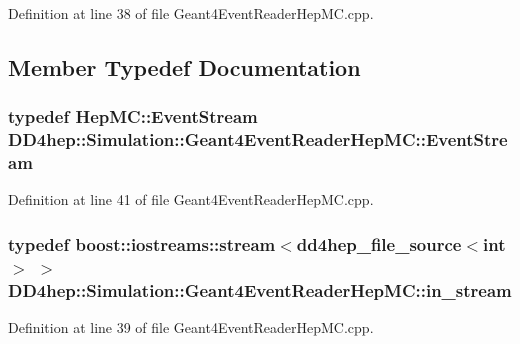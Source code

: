 Definition at line 38 of file Geant4EventReaderHepMC.cpp.

\subsection{Member Typedef Documentation}
\hypertarget{class_d_d4hep_1_1_simulation_1_1_geant4_event_reader_hep_m_c_a260380eb48d2adb971aaade903a47da8}{
\subsubsection[{EventStream}]{\setlength{\rightskip}{0pt plus 5cm}typedef {\bf HepMC::EventStream} {\bf DD4hep::Simulation::Geant4EventReaderHepMC::EventStream}}}
\label{class_d_d4hep_1_1_simulation_1_1_geant4_event_reader_hep_m_c_a260380eb48d2adb971aaade903a47da8}


Definition at line 41 of file Geant4EventReaderHepMC.cpp.\hypertarget{class_d_d4hep_1_1_simulation_1_1_geant4_event_reader_hep_m_c_a1a456562e141e47288810fb708fa3815}{
\subsubsection[{in\_\-stream}]{\setlength{\rightskip}{0pt plus 5cm}typedef boost::iostreams::stream$<${\bf dd4hep\_\-file\_\-source}$<$int$>$ $>$ {\bf DD4hep::Simulation::Geant4EventReaderHepMC::in\_\-stream}}}
\label{class_d_d4hep_1_1_simulation_1_1_geant4_event_reader_hep_m_c_a1a456562e141e47288810fb708fa3815}


Definition at line 39 of file Geant4EventReaderHepMC.cpp.

